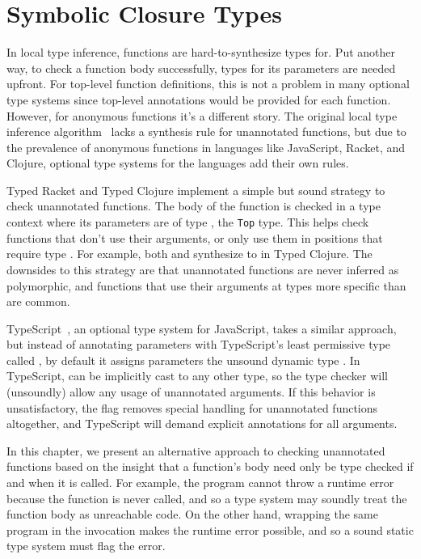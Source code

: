 \chapter{Symbolic Closure Types}
\label{chapter:symbolic:symbolic-closures}

In local type inference, functions are hard-to-synthesize types for.
Put another way, to check a function body successfully, types for
its parameters are needed upfront.
For top-level function definitions, this is not a problem in many
optional type systems since top-level annotations would be provided
for each function.
However, for anonymous functions it's a different story.
The original local type inference algorithm~\cite{PierceLTI}
lacks a synthesis rule for unannotated functions, but due to the prevalence
of anonymous functions in languages like JavaScript, Racket, and Clojure,
optional type systems for the languages add their own rules.

Typed Racket and Typed Clojure implement a simple but sound strategy
to check unannotated functions. The body of the function is checked
in a type context where its parameters are of type ,
the \texttt{Top} type.
This helps check functions that don't use their arguments, or only
use them in positions that require type .
For example, both  and  
synthesize to  in Typed Clojure.
The downsides to this strategy are that unannotated functions are never
inferred as polymorphic, and functions that use their arguments
at types more specific than  are common.

TypeScript~\cite{typescript}, an optional type system for JavaScript,
takes a similar approach, but instead of annotating parameters with
TypeScript's least permissive type called ,
by default it assigns parameters the unsound dynamic type .
In TypeScript,  can be implicitly cast to any other type,
so the type checker will (unsoundly) allow any usage of unannotated arguments.
If this behavior is unsatisfactory,
the  flag removes special handling for unannotated
functions altogether, and TypeScript will demand explicit annotations for all arguments.

In this chapter, we present an alternative approach to checking unannotated functions
based on the insight that a function's body need only be type checked if and when it is called.
For example, the program  cannot throw a runtime error because
the function is never called, and so a type system may soundly treat the function body as unreachable code.
On the other hand, wrapping the same program in the invocation
makes the runtime error possible, and so a sound static type system must flag the error.

